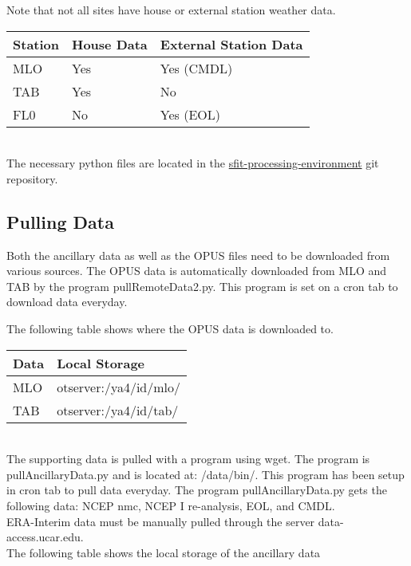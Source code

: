 \documentclass[12pt, letterpaper]{article}
\begin{document}
\noindent Note that not all sites have house or external station weather data.\\

\begin{tabular}{ l l l }
\textbf{Station} & \textbf{House Data} & \textbf{External Station Data} \\
\hline
MLO   & Yes & Yes (CMDL) \\
TAB   & Yes & No         \\
FL0   & No  & Yes (EOL)  \\
\end{tabular} \\

\noindent The necessary python files are located in the \href{https://git.ucar.edu/?p=sfit-processing-environment.git}{sfit-processing-environment} git repository. \\

\subsection{Pulling Data}
\label{sec:PD}
Both the ancillary data as well as the OPUS files need to be downloaded from various sources. The OPUS data is automatically downloaded from MLO and TAB by the program pullRemoteData2.py. This program is set on a cron tab to download data everyday.

\noindent The following table shows where the OPUS data is downloaded to.\\

\begin{tabular}{ l l }
\textbf{Data} & \textbf{Local Storage} \\
\hline
MLO   & otserver:/ya4/id/mlo/   \\
TAB   & otserver:/ya4/id/tab/   \\
\end{tabular} \\

\noindent The supporting data is pulled with a program using wget. The program is pullAncillaryData.py and is located at: /data/bin/. This program has been setup in cron tab to pull data everyday. The program pullAncillaryData.py gets the following data: NCEP nmc, NCEP I re-analysis, EOL, and CMDL. \\

\noindent ERA-Interim data must be manually pulled through the server data-access.ucar.edu.\\

\noindent The following table shows the local storage of the ancillary data\\
\end{document}
